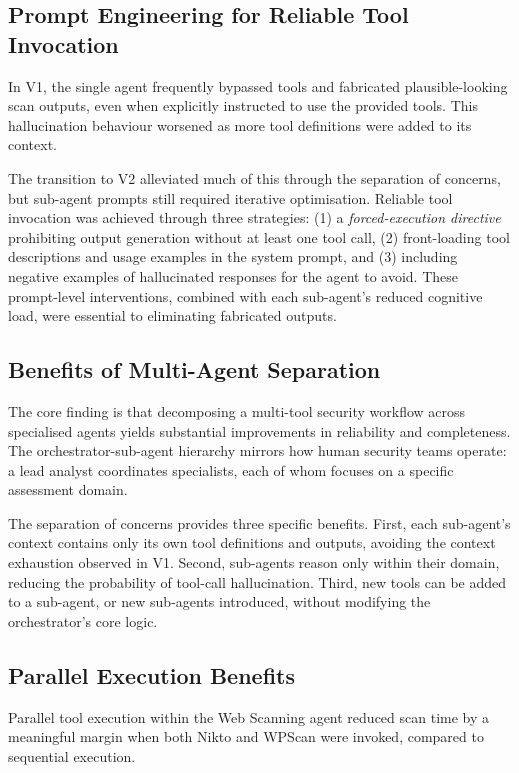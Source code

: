 \documentclass[sigconf,anonymous]{acmart}
\begin{document}
\subsection{Prompt Engineering for Reliable Tool Invocation}

In V1, the single agent frequently bypassed tools and fabricated plausible-looking scan outputs, even when explicitly instructed to use the provided tools. This hallucination behaviour worsened as more tool definitions were added to its context.

The transition to V2 alleviated much of this through the separation of concerns, but sub-agent prompts still required iterative optimisation. Reliable tool invocation was achieved through three strategies: (1) a \emph{forced-execution directive} prohibiting output generation without at least one tool call, (2) front-loading tool descriptions and usage examples in the system prompt, and (3) including negative examples of hallucinated responses for the agent to avoid. These prompt-level interventions, combined with each sub-agent's reduced cognitive load, were essential to eliminating fabricated outputs.

\subsection{Benefits of Multi-Agent Separation}

The core finding is that decomposing a multi-tool security workflow across specialised agents yields substantial improvements in reliability and completeness. The orchestrator-sub-agent hierarchy mirrors how human security teams operate: a lead analyst coordinates specialists, each of whom focuses on a specific assessment domain.

The separation of concerns provides three specific benefits. First, each sub-agent's context contains only its own tool definitions and outputs, avoiding the context exhaustion observed in V1. Second, sub-agents reason only within their domain, reducing the probability of tool-call hallucination. Third, new tools can be added to a sub-agent, or new sub-agents introduced, without modifying the orchestrator's core logic.

\subsection{Parallel Execution Benefits}

Parallel tool execution within the Web Scanning agent reduced scan time by a meaningful margin when both Nikto and WPScan were invoked, compared to sequential execution.
\end{document}
